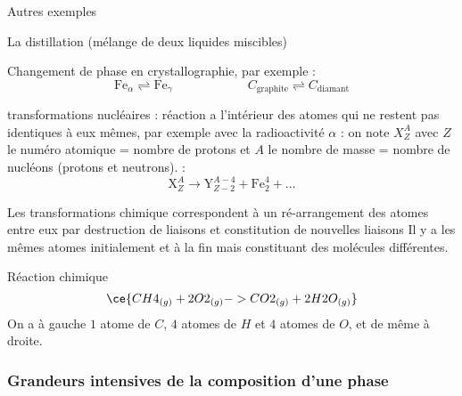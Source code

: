     \begin{example}{Autres exemples}{}
        \begin{enumerate}
            \itt La distillation (mélange de deux liquides miscibles)
            
            \itt Changement de phase en crystallographie, par exemple :
            \[ \mathrm{Fe}_\alpha \rightleftharpoons \mathrm{Fe}_\gamma \qquad\qquad\qquad C_\text{graphite} \rightleftharpoons C_\text{diamant} \]
            
            \itt transformations nucléaires  : réaction a l'intérieur des atomes qui ne restent pas identiques à eux mêmes, par exemple avec la radioactivité $\alpha$ : \quad on note $X_Z^A$ avec $Z$ le numéro atomique = nombre de protons et $A$ le nombre de masse = nombre de nucléons (protons et neutrons). :
            \[ \mathrm X_Z^A \longrightarrow \mathrm Y_{Z-2}^{A-4} + \mathrm{Fe}_2^4 + \dots\]
        \end{enumerate}
    \end{example}
    
    Les transformations chimique correspondent à un ré-arrangement des atomes entre eux par destruction de liaisons et constitution de nouvelles liaisons Il y a les mêmes atomes initialement et à la fin mais constituant des molécules différentes.

    \begin{example}{Réaction chimique}{}
        \[ \ce{CH4_{(g)} + 2O2_{(g)} -> CO2_{(g)} + 2H2O_{(g)}} \]
        On a à gauche $1$ atome de $C$, $4$ atomes de $H$ et $4$ atomes de $O$, et de même à droite.
    \end{example}
    
    \subsubsection{Grandeurs intensives de la composition d'une phase}
    
